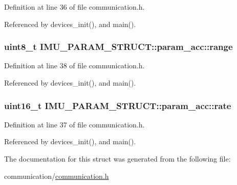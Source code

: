 Definition at line 36 of file communication.\-h.



Referenced by devices\-\_\-init(), and main().

\hypertarget{structIMU__PARAM__STRUCT_1_1param__acc_a26199b298ef2d353192dfbc706bce8cf}{
\subsubsection[{range}]{\setlength{\rightskip}{0pt plus 5cm}uint8\-\_\-t I\-M\-U\-\_\-\-P\-A\-R\-A\-M\-\_\-\-S\-T\-R\-U\-C\-T\-::param\-\_\-acc\-::range}}\label{structIMU__PARAM__STRUCT_1_1param__acc_a26199b298ef2d353192dfbc706bce8cf}


Definition at line 38 of file communication.\-h.



Referenced by devices\-\_\-init(), and main().

\hypertarget{structIMU__PARAM__STRUCT_1_1param__acc_a30e6a318cad098cd8379416705820f95}{
\subsubsection[{rate}]{\setlength{\rightskip}{0pt plus 5cm}uint16\-\_\-t I\-M\-U\-\_\-\-P\-A\-R\-A\-M\-\_\-\-S\-T\-R\-U\-C\-T\-::param\-\_\-acc\-::rate}}\label{structIMU__PARAM__STRUCT_1_1param__acc_a30e6a318cad098cd8379416705820f95}


Definition at line 37 of file communication.\-h.



Referenced by devices\-\_\-init(), and main().



The documentation for this struct was generated from the following file\-:\begin{DoxyCompactItemize}
\item 
communication/\hyperlink{communication_2communication_8h}{communication.\-h}\end{DoxyCompactItemize}
